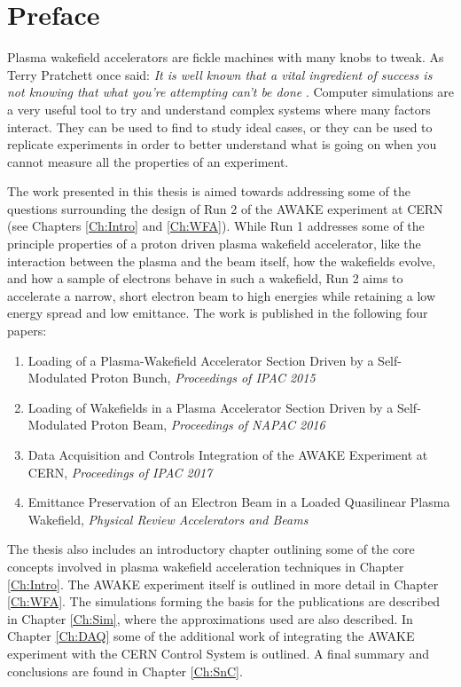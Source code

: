 \chapter*{Preface}

Plasma wakefield accelerators are fickle machines with many knobs to tweak. As Terry Pratchett once said: \textit{It is well known that a vital ingredient of success is not knowing that what you're attempting can't be done} \cite{pratchett:1987}. Computer simulations are a very useful tool to try and understand complex systems where many factors interact. They can be used to find to study ideal cases, or they can be used to replicate experiments in order to better understand what is going on when you cannot measure all the properties of an experiment.

The work presented in this thesis is aimed towards addressing some of the questions surrounding the design of Run 2 of the AWAKE experiment at CERN (see Chapters \ref{Ch:Intro} and \ref{Ch:WFA}). While Run 1 addresses some of the principle properties of a proton driven plasma wakefield accelerator, like the interaction between the plasma and the beam itself, how the wakefields evolve, and how a sample of electrons behave in such a wakefield, Run 2 aims to accelerate a narrow, short electron beam to high energies while retaining a low energy spread and low emittance. The work is published in the following four papers:

\begin{enumerate}[I]
    \item Loading of a Plasma-Wakefield Accelerator Section Driven by a Self-Modulated Proton Bunch, \emph{Proceedings of IPAC 2015} \cite{berglyd_olsen:2015}
    \item Loading of Wakefields in a Plasma Accelerator Section Driven by a Self-Modulated Proton Beam, \emph{Proceedings of NAPAC 2016} \cite{berglyd_olsen:2016}
    \item Data Acquisition and Controls Integration of the AWAKE Experiment at CERN, \emph{Proceedings of IPAC 2017} \cite{berglyd_olsen:2017}
    \item Emittance Preservation of an Electron Beam in a Loaded Quasilinear Plasma Wakefield, \emph{Physical Review Accelerators and Beams} \cite{berglyd_olsen:2018}
\end{enumerate}

The thesis also includes an introductory chapter outlining some of the core concepts involved in plasma wakefield acceleration techniques in Chapter \ref{Ch:Intro}. The AWAKE experiment itself is outlined in more detail in Chapter \ref{Ch:WFA}. The simulations forming the basis for the publications are described in Chapter \ref{Ch:Sim}, where the approximations used are also described. In Chapter \ref{Ch:DAQ} some of the additional work of integrating the AWAKE experiment with the CERN Control System is outlined. A final summary and conclusions are found in Chapter \ref{Ch:SnC}.

